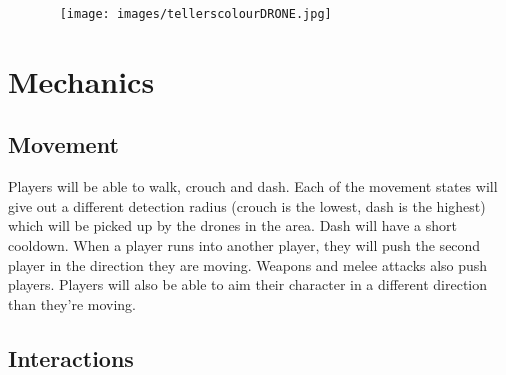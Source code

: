\documentclass[10pt]{report}
\begin{document}
\begin{figure}[H]\
    \centering
    \texttt{[image: images/tellerscolourDRONE.jpg]}
\end{figure}

\section{Mechanics}

\subsection{Movement}

Players will be able to walk, crouch and dash. Each of the movement states will give out a different detection radius (crouch is the lowest, dash is the highest) which will be picked up by the drones in the area. Dash will have a short cooldown. When a player runs into another player, they will push the second player in the direction they are moving. Weapons and melee attacks also push players. Players will also be able to aim their character in a different direction than they’re moving.

\subsection{Interactions}
\end{document}
